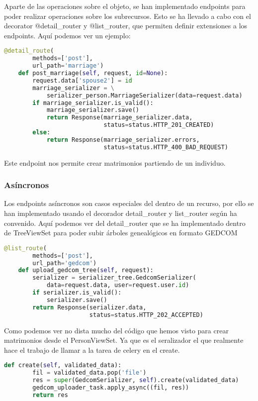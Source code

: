 Aparte de las operaciones sobre el objeto, se han implementado endpoints para poder realizar operaciones sobre los subrecursos. Esto se ha llevado a cabo con el decorator @detail\_router y @list\_router, que permiten definir extensiones a los endpoints. Aquí podemos ver un ejemplo:
\begin{lstlisting}[language=python]
@detail_route(
        methods=['post'],
        url_path='marriage')
    def post_marriage(self, request, id=None):
        request.data['spouse2'] = id
        marriage_serializer = \
            serializer_person.MarriageSerializer(data=request.data)
        if marriage_serializer.is_valid():
            marriage_serializer.save()
            return Response(marriage_serializer.data,
                            status=status.HTTP_201_CREATED)
        else:
            return Response(marriage_serializer.errors,
                            status=status.HTTP_400_BAD_REQUEST)
\end{lstlisting}
Este endpoint nos permite crear matrimonios partiendo de un individuo.

\subsubsection{Asíncronos}
Los endpoints asíncronos son casos especiales del dentro de un recurso,  por ello se han implementado usando el decorador detail\_router y list\_router según ha convenido. Aquí podemos ver del detail\_router que se ha implementado dentro de TreeViewSet para poder subir árboles genealógicos en formato GEDCOM

\begin{lstlisting}[language=python]
    @list_route(
        methods=['post'],
        url_path='gedcom')
    def upload_gedcom_tree(self, request):
        serializer = serializer_tree.GedcomSerializer(
            data=request.data, user=request.user.id)
        if serializer.is_valid():
            serializer.save()
        return Response(serializer.data,
                        status=status.HTTP_202_ACCEPTED)
\end{lstlisting}

Como podemos ver no dista mucho del código que hemos visto para crear matrimonios desde el PersonViewSet. Ya que es el seralizador el que realmente hace el trabajo de llamar a la tarea de celery en el create.
\begin{lstlisting}[language=python]
    def create(self, validated_data):
        fil = validated_data.pop('file')
        res = super(GedcomSerializer, self).create(validated_data)
        gedcom_uploader_task.apply_async((fil, res))
        return res
\end{lstlisting}

